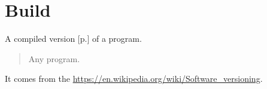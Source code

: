 \section{Build}
\label{sec:Build}

 A compiled version [p.\pageref{sec:Version}] of a program. 

\begin{quote}
Any program.            \end{quote} 

It comes from the \url{https://en.wikipedia.org/wiki/Software_versioning}.